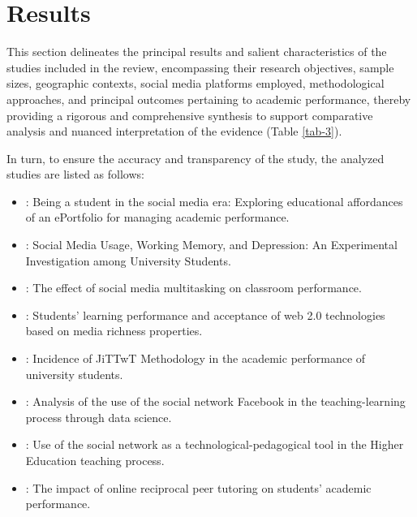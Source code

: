\documentclass[english]{textolivre}
\begin{document}
\section{Results}
This section delineates the principal results and salient characteristics of the studies included in the review, encompassing their research objectives, sample sizes, geographic contexts, social media platforms employed, methodological approaches, and principal outcomes pertaining to academic performance, thereby providing a rigorous and comprehensive synthesis to support comparative analysis and nuanced interpretation of the evidence (Table \ref{tab-3}).

In turn, to ensure the accuracy and transparency of the study, the analyzed studies are listed as follows:

\begin{itemize}
    \item \textcite{alexiou2020}: Being a student in the social media era: Exploring educational affordances of an ePortfolio for managing academic performance.
\item \textcite{almarzouki2022}: Social Media Usage, Working Memory, and Depression: An Experimental Investigation among University Students.
\item \textcite{demirbilek2018}: The effect of social media multitasking on classroom performance.
\item \textcite{penalba2020}: Students’ learning performance and acceptance of web 2.0 technologies based on media richness properties.
\item \textcite{perezsuasnavas2022}: Incidence of JiTTwT Methodology in the academic performance of university students.
\item \textcite{salasrueda2019}: Analysis of the use of the social network Facebook in the teaching-learning process through data science.
\item \textcite{salasrueda2018}: Use of the social network as a technological-pedagogical tool in the Higher Education teaching process.
\item \textcite{zulkifli2018}: The impact of online reciprocal peer tutoring on students’ academic performance.
\end{itemize}

\begingroup
\scriptsize
\setlength{\tabcolsep}{3pt}
\end{document}
